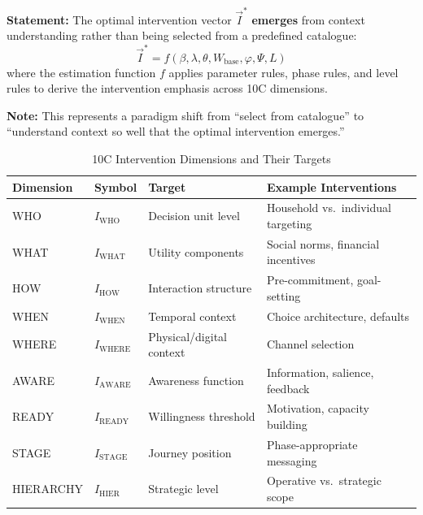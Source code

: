\begin{tcolorbox}[colback=green!5!white, colframe=green!75!black,
    title=\textbf{Theorem HHH-T1: Context-Driven Vector Emergence}]

\textbf{Statement:} The optimal intervention vector $\vec{I}^*$ \textbf{emerges} from context understanding rather than being selected from a predefined catalogue:
\begin{equation}
\vec{I}^* = f(\beta, \lambda, \theta, W_{\text{base}}, \varphi, \Psi, L)
\end{equation}
where the estimation function $f$ applies parameter rules, phase rules, and level rules to derive the intervention emphasis across 10C dimensions.

\textbf{Note:} This represents a paradigm shift from ``select from catalogue'' to ``understand context so well that the optimal intervention emerges.''
\end{tcolorbox}

\begin{table}[htbp]
\centering
\caption{10C Intervention Dimensions and Their Targets}
\label{tab:hhh-10c-dimensions}
\renewcommand{\arraystretch}{1.3}
\begin{tabular}{@{}llp{4cm}p{4cm}@{}}
\toprule
\textbf{Dimension} & \textbf{Symbol} & \textbf{Target} & \textbf{Example Interventions} \\
\midrule
WHO & $I_{\text{WHO}}$ & Decision unit level & Household vs.\ individual targeting \\
WHAT & $I_{\text{WHAT}}$ & Utility components & Social norms, financial incentives \\
HOW & $I_{\text{HOW}}$ & Interaction structure & Pre-commitment, goal-setting \\
WHEN & $I_{\text{WHEN}}$ & Temporal context & Choice architecture, defaults \\
WHERE & $I_{\text{WHERE}}$ & Physical/digital context & Channel selection \\
AWARE & $I_{\text{AWARE}}$ & Awareness function & Information, salience, feedback \\
READY & $I_{\text{READY}}$ & Willingness threshold & Motivation, capacity building \\
STAGE & $I_{\text{STAGE}}$ & Journey position & Phase-appropriate messaging \\
HIERARCHY & $I_{\text{HIER}}$ & Strategic level & Operative vs.\ strategic scope \\
\bottomrule
\end{tabular}
\end{table}

